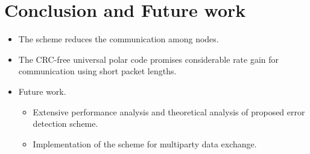 \documentclass[
11pt, %
a4paper, %
oneside, %
headinclude,footinclude, %
BCOR5mm, %
]{scrartcl}
\begin{document}
\section*{Conclusion and Future work}\label{future}
\begin{itemize}
\item The scheme reduces the communication among nodes.
\item The CRC-free universal polar code promises considerable rate gain for communication using short packet lengths. 
\end{itemize}
\begin{itemize}
\item Future work.
\begin{itemize}
\item Extensive performance analysis and theoretical analysis of proposed error detection scheme. 
\item Implementation of the scheme for multiparty data exchange.
\end{itemize}
\end{itemize}




\clearpage




\end{document}
